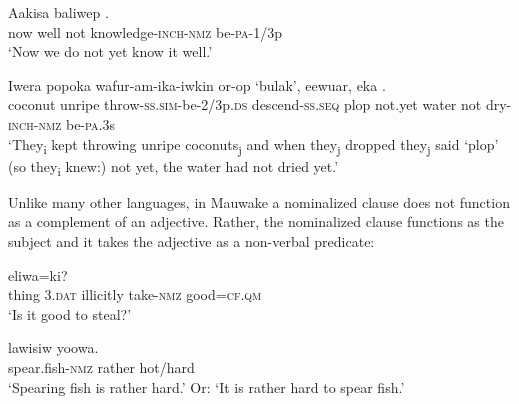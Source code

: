 \ea%
\label{ex:x1254}
\gll Aakisa  baliwep    . \\
     now  well  not  knowledge-\textsc{inch}-\textsc{nmz}  be-\textsc{pa}-1/3p \\
\glt `Now we do not yet know it well.'
\z

\ea%
\label{ex:x1256}
\gll Iwera  popoka  wafur-am-ika-iwkin  or-op  `bulak', eewuar,  eka    . \\
     coconut  unripe  throw-\textsc{ss}.\textsc{sim}-be-2/3p.\textsc{ds}  descend-\textsc{ss}.\textsc{seq}  plop not.yet  water  not  dry-\textsc{inch}-\textsc{nmz}  be-\textsc{pa}.3s \\
\glt `They\textsubscript{i} kept throwing unripe coconuts\textsubscript{j} and when they\textsubscript{j} dropped they\textsubscript{j} said `plop' (so they\textsubscript{i} knew:) not yet, the water had not dried yet.'
\z

Unlike many other languages, in Mauwake a nominalized clause does not function as a complement of an adjective. Rather, the nominalized clause functions as the subject and it takes the adjective as a non-verbal predicate: 

\ea%
\label{ex:x1258}
\gll {}     eliwa=ki? \\
     thing  3.\textsc{dat}  illicitly  take-\textsc{nmz}  good=\textsc{cf}.\textsc{qm} \\
\glt `Is it good to steal?'
\z

\ea%
\label{ex:x1259}
\gll {}  lawisiw  yoowa. \\
     spear.fish-\textsc{nmz}  rather  hot/hard \\
\glt `Spearing fish is rather hard.' Or: `It is rather hard to spear fish.'
\z


